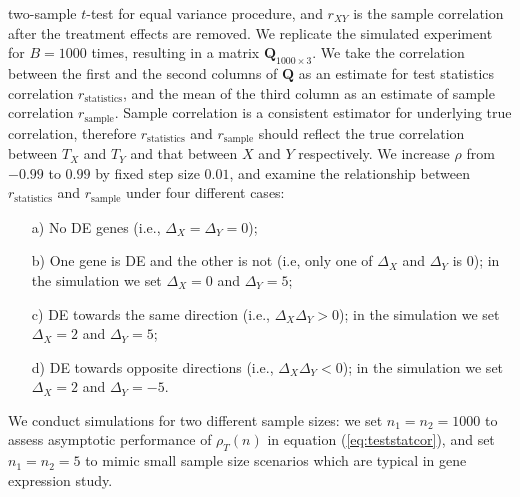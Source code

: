 \documentclass[12pt, a4paper]{article}
\begin{document}
	two-sample $t$-test for equal variance procedure, and $r_{XY}$ is the sample correlation after 
	the treatment effects  are removed. We replicate the simulated
	experiment for $B=1000$ times, resulting in a matrix $\bm Q_{1000\times 3}$. We take the correlation between the first and the second columns of $\bm Q$ as an estimate for test statistics correlation	$r_\text{statistics}$, and 
	the mean of the third column as an estimate of sample correlation $r_{\text{sample}}$. 
	Sample correlation is a consistent estimator for underlying true correlation, therefore
		$r_\text{statistics}$ and $r_{\text{sample}}$ should reflect the true correlation between $T_X$ and $T_Y$ and 
		that between $X$ and $Y$ respectively. 
		We increase $\rho$ from $-0.99$ to $0.99$ by fixed step size $0.01$, and examine the relationship between $r_\text{statistics}$ and $r_{\text{sample}}$ under four different cases:
	\begin{enumerate}
		\item[a)] No DE genes (i.e., $\Delta_X = \Delta_Y  =0$);
		\item[b)] One gene is DE and the other is not (i.e, only one of $\Delta_X$ and $\Delta_Y$ is 0); in the simulation we set $\Delta_X = 0$ and $\Delta_Y=5$;
		\item[c)] DE towards the same direction (i.e., $\Delta_X\Delta_Y>0$); in the simulation we set $\Delta_X = 2$ and $\Delta_Y=5$;
		\item[d)] DE towards opposite directions (i.e., $\Delta_X\Delta_Y <0$); in the simulation we set $\Delta_X = 2$ and $\Delta_Y=-5$.
		\end{enumerate}
		
	We conduct simulations for two different sample sizes: we set $n_1 = n_2 = 1000$ to assess 
	asymptotic performance of $\rho_T(n)$ in equation (\ref{eq:teststatcor}), and set $n_1 = n_2 
	= 5$ to mimic small sample size scenarios which are typical in gene expression study. 
			
\end{document}
